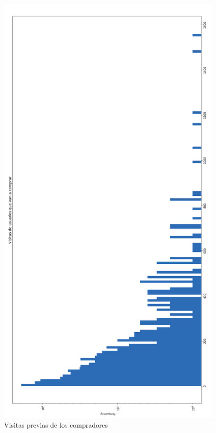 \documentclass[a4paper ,12pt]{article}
\begin{document}
\begin{figure}[H]
\centering
\includegraphics[width=\linewidth ,  height=0.95\textheight]{visitas_prev_compras}
\caption{Visitas previas de los compradores}
\label{fig:visitas_prev_compras}
\end{figure}
\end{document}
